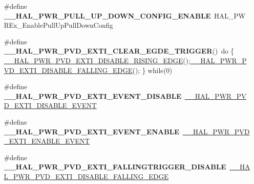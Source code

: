 \begin{DoxyCompactItemize}
\item 
\hypertarget{group___h_a_l___p_w_r___aliased___macros_gadb15c53f7c44954ed13114d2a06310f8}{\#define {\bfseries \-\_\-\-\_\-\-H\-A\-L\-\_\-\-P\-W\-R\-\_\-\-P\-U\-L\-L\-\_\-\-U\-P\-\_\-\-D\-O\-W\-N\-\_\-\-C\-O\-N\-F\-I\-G\-\_\-\-E\-N\-A\-B\-L\-E}~H\-A\-L\-\_\-\-P\-W\-R\-Ex\-\_\-\-Enable\-Pull\-Up\-Pull\-Down\-Config}\label{group___h_a_l___p_w_r___aliased___macros_gadb15c53f7c44954ed13114d2a06310f8}

\item 
\hypertarget{group___h_a_l___p_w_r___aliased___macros_ga288b776e260c65b683ae05a335f5826b}{\#define {\bfseries \-\_\-\-\_\-\-H\-A\-L\-\_\-\-P\-W\-R\-\_\-\-P\-V\-D\-\_\-\-E\-X\-T\-I\-\_\-\-C\-L\-E\-A\-R\-\_\-\-E\-G\-D\-E\-\_\-\-T\-R\-I\-G\-G\-E\-R}()~do \{ \hyperlink{group___p_w_r___exported___macros_ga1ca8fd7f3286a176f6be540c75a004c6}{\-\_\-\-\_\-\-H\-A\-L\-\_\-\-P\-W\-R\-\_\-\-P\-V\-D\-\_\-\-E\-X\-T\-I\-\_\-\-D\-I\-S\-A\-B\-L\-E\-\_\-\-R\-I\-S\-I\-N\-G\-\_\-\-E\-D\-G\-E}();\hyperlink{group___p_w_r___exported___macros_ga1ca57168205f8cd8d1014e6eb9465f2d}{\-\_\-\-\_\-\-H\-A\-L\-\_\-\-P\-W\-R\-\_\-\-P\-V\-D\-\_\-\-E\-X\-T\-I\-\_\-\-D\-I\-S\-A\-B\-L\-E\-\_\-\-F\-A\-L\-L\-I\-N\-G\-\_\-\-E\-D\-G\-E}(); \} while(0)}\label{group___h_a_l___p_w_r___aliased___macros_ga288b776e260c65b683ae05a335f5826b}

\item 
\hypertarget{group___h_a_l___p_w_r___aliased___macros_ga42775d277d6bc8441d6e03a90a133f0b}{\#define {\bfseries \-\_\-\-\_\-\-H\-A\-L\-\_\-\-P\-W\-R\-\_\-\-P\-V\-D\-\_\-\-E\-X\-T\-I\-\_\-\-E\-V\-E\-N\-T\-\_\-\-D\-I\-S\-A\-B\-L\-E}~\hyperlink{group___p_w_r___exported___macros_ga8bd379e960497722450c7cea474a7e7a}{\-\_\-\-\_\-\-H\-A\-L\-\_\-\-P\-W\-R\-\_\-\-P\-V\-D\-\_\-\-E\-X\-T\-I\-\_\-\-D\-I\-S\-A\-B\-L\-E\-\_\-\-E\-V\-E\-N\-T}}\label{group___h_a_l___p_w_r___aliased___macros_ga42775d277d6bc8441d6e03a90a133f0b}

\item 
\hypertarget{group___h_a_l___p_w_r___aliased___macros_ga86b9e24e897c84a1441dc92c88435c00}{\#define {\bfseries \-\_\-\-\_\-\-H\-A\-L\-\_\-\-P\-W\-R\-\_\-\-P\-V\-D\-\_\-\-E\-X\-T\-I\-\_\-\-E\-V\-E\-N\-T\-\_\-\-E\-N\-A\-B\-L\-E}~\hyperlink{group___p_w_r___exported___macros_gae5ba5672fe8cb7c1686c7f2cc211b128}{\-\_\-\-\_\-\-H\-A\-L\-\_\-\-P\-W\-R\-\_\-\-P\-V\-D\-\_\-\-E\-X\-T\-I\-\_\-\-E\-N\-A\-B\-L\-E\-\_\-\-E\-V\-E\-N\-T}}\label{group___h_a_l___p_w_r___aliased___macros_ga86b9e24e897c84a1441dc92c88435c00}

\item 
\hypertarget{group___h_a_l___p_w_r___aliased___macros_gaeccf45c0c61b98bd212bd7cf905c65fd}{\#define {\bfseries \-\_\-\-\_\-\-H\-A\-L\-\_\-\-P\-W\-R\-\_\-\-P\-V\-D\-\_\-\-E\-X\-T\-I\-\_\-\-F\-A\-L\-L\-I\-N\-G\-T\-R\-I\-G\-G\-E\-R\-\_\-\-D\-I\-S\-A\-B\-L\-E}~\hyperlink{group___p_w_r___exported___macros_ga1ca57168205f8cd8d1014e6eb9465f2d}{\-\_\-\-\_\-\-H\-A\-L\-\_\-\-P\-W\-R\-\_\-\-P\-V\-D\-\_\-\-E\-X\-T\-I\-\_\-\-D\-I\-S\-A\-B\-L\-E\-\_\-\-F\-A\-L\-L\-I\-N\-G\-\_\-\-E\-D\-G\-E}}\label{group___h_a_l___p_w_r___aliased___macros_gaeccf45c0c61b98bd212bd7cf905c65fd}


\end{DoxyCompactItemize}
